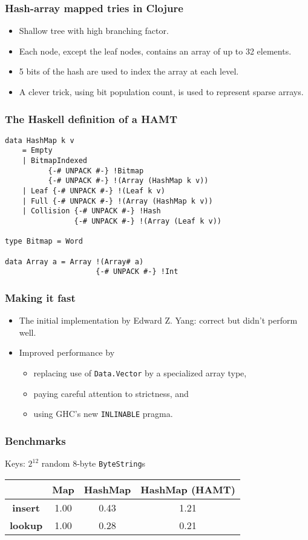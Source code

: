 \documentclass[xetex,mathserif,serif]{beamer}
\begin{document}
\begin{frame}
  \frametitle{Hash-array mapped tries in Clojure}
  \begin{itemize}
  \item Shallow tree with high branching factor.
  \item Each node, except the leaf nodes, contains an array of up to
    32 elements.
  \item 5 bits of the hash are used to index the array at each level.
  \item A clever trick, using bit population count, is used to
    represent sparse arrays.
  \end{itemize}
\end{frame}

\begin{frame}[fragile]
  \frametitle{The Haskell definition of a HAMT}
  \begin{lstlisting}
data HashMap k v
    = Empty
    | BitmapIndexed
          {-# UNPACK #-} !Bitmap
          {-# UNPACK #-} !(Array (HashMap k v))
    | Leaf {-# UNPACK #-} !(Leaf k v)
    | Full {-# UNPACK #-} !(Array (HashMap k v))
    | Collision {-# UNPACK #-} !Hash
                {-# UNPACK #-} !(Array (Leaf k v))

type Bitmap = Word

data Array a = Array !(Array# a)
                     {-# UNPACK #-} !Int
  \end{lstlisting}
\end{frame}

\begin{frame}
  \frametitle{Making it fast}
  \begin{itemize}
  \item The initial implementation by Edward Z. Yang: correct but
    didn't perform well.
    \item Improved performance by
      \begin{itemize}
        \item replacing use of \lstinline!Data.Vector! by a
          specialized array type,
        \item paying careful attention to strictness, and
        \item using GHC's new \texttt{INLINABLE} pragma.
      \end{itemize}
  \end{itemize}
\end{frame}

\begin{frame}
  \frametitle{Benchmarks}

  Keys: $2^{12}$ random 8-byte \lstinline!ByteString!s

  \bigskip
  \begin{tabular}{|c|c|c|c|}
    \hline  & \textbf{Map} & \textbf{HashMap} &
    \textbf{HashMap (HAMT)} \\
    \hline \textbf{insert} & 1.00 & 0.43 & 1.21 \\
    \hline \textbf{lookup} & 1.00 & 0.28 & 0.21 \\
    \hline
  \end{tabular}
\end{frame}
\end{document}
